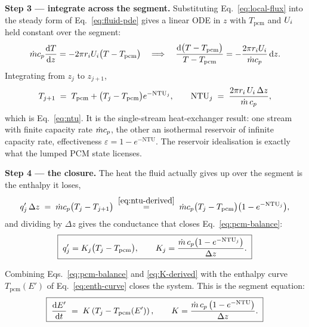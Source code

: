 \medskip
\noindent\textbf{Step 3 --- integrate across the segment.}
Substituting Eq.~\eqref{eq:local-flux} into the steady form of
Eq.~\eqref{eq:fluid-pde} gives a linear ODE in $z$ with $T_{\mathrm{pcm}}$ and
$U_{i}$ held constant over the segment:
\begin{equation}
  \dot m c_{p}\frac{\mathrm{d}T}{\mathrm{d}z}
  = -2\pi r_{i}U_{i}\bigl(T-T_{\mathrm{pcm}}\bigr)
  \quad\Longrightarrow\quad
  \frac{\mathrm{d}\bigl(T-T_{\mathrm{pcm}}\bigr)}{T-T_{\mathrm{pcm}}}
  = -\frac{2\pi r_{i}U_{i}}{\dot m c_{p}}\,\mathrm{d}z .
\end{equation}
Integrating from $z_{j}$ to $z_{j+1}$,
\begin{equation}
  T_{j+1} \;=\; T_{\mathrm{pcm}}
    + \bigl(T_{j}-T_{\mathrm{pcm}}\bigr)e^{-\mathrm{NTU}_{j}},
  \qquad
  \mathrm{NTU}_{j} \;=\; \frac{2\pi r_{i}\,U_{i}\,\Delta z}{\dot m\,c_{p}},
  \label{eq:ntu-derived}
\end{equation}
which is Eq.~\eqref{eq:ntu}. It is the single-stream heat-exchanger result: one
stream with finite capacity rate $\dot m c_{p}$, the other an isothermal reservoir
of infinite capacity rate, effectiveness $\varepsilon = 1-e^{-\mathrm{NTU}}$.
The reservoir idealisation is exactly what the lumped PCM state licenses.

\medskip
\noindent\textbf{Step 4 --- the closure.}
The heat the fluid actually gives up over the segment is the enthalpy it loses,
\begin{equation}
  q'_{j}\,\Delta z \;=\; \dot m c_{p}\bigl(T_{j}-T_{j+1}\bigr)
  \;\overset{\eqref{eq:ntu-derived}}{=}\;
  \dot m c_{p}\bigl(T_{j}-T_{\mathrm{pcm}}\bigr)\bigl(1-e^{-\mathrm{NTU}_{j}}\bigr),
\end{equation}
and dividing by $\Delta z$ gives the conductance that closes
Eq.~\eqref{eq:pcm-balance}:
\begin{equation}
  \boxed{\;
  q'_{j} = K_{j}\bigl(T_{j}-T_{\mathrm{pcm}}\bigr),
  \qquad
  K_{j} = \frac{\dot m\,c_{p}\bigl(1-e^{-\mathrm{NTU}_{j}}\bigr)}{\Delta z} .
  \;}
  \label{eq:K-derived}
\end{equation}

Combining Eqs.~\eqref{eq:pcm-balance} and \eqref{eq:K-derived} with the
enthalpy curve $T_{\mathrm{pcm}}(E')$ of Eq.~\eqref{eq:enth-curve} closes the
system. This is the segment equation:
\begin{equation}
  \boxed{\;
  \frac{\mathrm{d}E'}{\mathrm{d}t}
  \;=\; K\left(T_{j} - T_{\mathrm{pcm}}(E')\right),
  \qquad
  K = \frac{\dot m\,c_{p}\left(1-e^{-\mathrm{NTU}}\right)}{\Delta z}.
  \;}
  \label{eq:enth-ode}
\end{equation}

